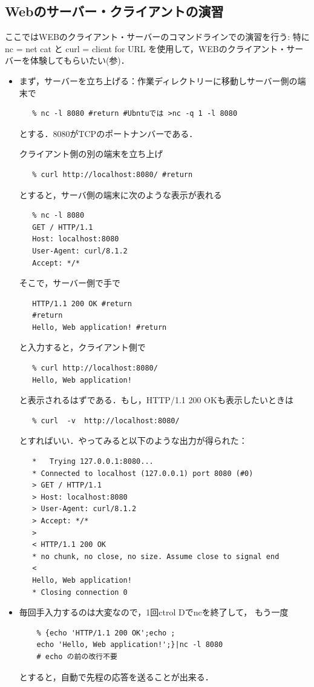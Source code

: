 \subsection{Webのサーバー・クライアントの演習}
ここではWEBのクライアント・サーバーのコマンドラインでの演習を行う:
特に nc  = net cat と
curl = client for URL を使用して，WEBのクライアント・サーバーを体験してもらいたい(\cite{Ko}参)．
\begin{itemize}
   \item
      まず，サーバーを立ち上げる：作業ディレクトリーに移動しサーバー側の端末で
\begin{verbatim}
   % nc -l 8080 #return #Ubntuでは >nc -q 1 -l 8080
\end{verbatim}
      とする．8080がTCPのポートナンバーである．

      クライアント側の別の端末を立ち上げ
\begin{verbatim}
   % curl http://localhost:8080/ #return
\end{verbatim}
      とすると，サーバ側の端末に次のような表示が表れる
\begin{verbatim}
   % nc -l 8080 
   GET / HTTP/1.1
   Host: localhost:8080
   User-Agent: curl/8.1.2
   Accept: */*

\end{verbatim}
      そこで，サーバー側で手で
\begin{verbatim}
   HTTP/1.1 200 OK #return
   #return
   Hello, Web application! #return
\end{verbatim}
      と入力すると，クライアント側で
\begin{verbatim}
   % curl http://localhost:8080/ 
   Hello, Web application!
\end{verbatim}
      と表示されるはずである．もし，HTTP/1.1 200 OKも表示したいときは
\begin{verbatim}
   % curl  -v  http://localhost:8080/ 
\end{verbatim}
とすればいい．やってみると以下のような出力が得られた：
\begin{verbatim} 
   *   Trying 127.0.0.1:8080...
   * Connected to localhost (127.0.0.1) port 8080 (#0)
   > GET / HTTP/1.1
   > Host: localhost:8080
   > User-Agent: curl/8.1.2
   > Accept: */*
   > 
   < HTTP/1.1 200 OK
   * no chunk, no close, no size. Assume close to signal end
   < 
   Hello, Web application!
   * Closing connection 0
\end{verbatim}

   \item
      毎回手入力するのは大変なので，1回ctrol Dでncを終了して，
      もう一度
\begin{verbatim}
    % {echo 'HTTP/1.1 200 OK';echo ; 
    echo 'Hello, Web application!';}|nc -l 8080 
    # echo の前の改行不要
 \end{verbatim}
       とすると，自動で先程の応答を送ることが出来る．
 

\end{itemize}
